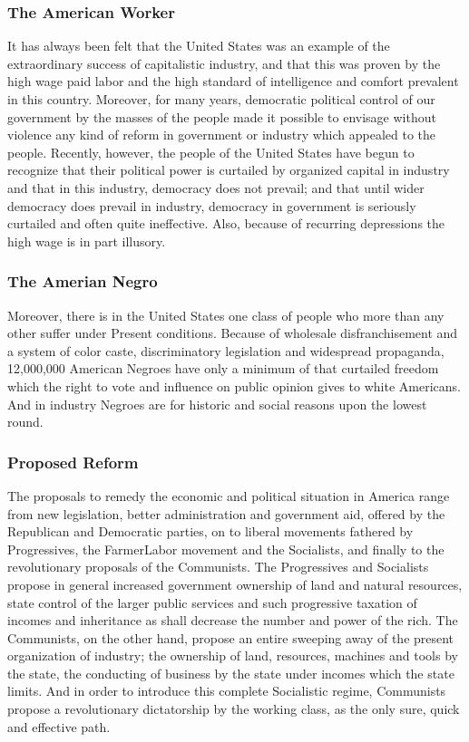 \documentclass[letterpaper,10pt,english]{jupyterBook}
\begin{document}
\subsubsection{The American Worker}
\label{\detokenize{Volumes/38/09/negro_and_communism:the-american-worker}}
\sphinxAtStartPar
It has always been felt that the United States was an example of the extraordinary success of capitalistic industry, and that this was proven by the high wage paid labor and the high standard of intelligence and comfort prevalent in this country. Moreover, for many years, democratic political control of our government by the masses of the people made it possible to envisage without violence any kind of reform in government or industry which appealed to the people. Recently, however, the people of the United States have begun to recognize that their political power is curtailed by organized capital in industry and that in this industry, democracy does not prevail; and that until wider democracy does prevail in industry, democracy in government is seriously curtailed and often quite ineffective. Also, because of recurring depressions the high wage is in part illusory.


\subsubsection{The Amerian Negro}
\label{\detokenize{Volumes/38/09/negro_and_communism:the-amerian-negro}}
\sphinxAtStartPar
Moreover, there is in the United States one class of people who more than any other suffer under Present conditions. Because of wholesale disfranchisement and a system of color caste, discriminatory legislation and widespread propaganda, 12,000,000 American Negroes have only a minimum of that curtailed freedom which the right to vote and influence on public opinion gives to white Americans. And in industry Negroes are for historic and social reasons upon the lowest round.


\subsubsection{Proposed Reform}
\label{\detokenize{Volumes/38/09/negro_and_communism:proposed-reform}}
\sphinxAtStartPar
The proposals to remedy the economic and political situation in America range from new legislation, better administration and government aid, offered by the Republican and Democratic parties, on to liberal movements fathered by Progressives, the Farmer\sphinxhyphen{}Labor movement and the Socialists, and finally to the revolutionary proposals of the Communists. The Progressives and Socialists propose in general increased government ownership of land and natural resources, state control of the larger public services and such progressive taxation of incomes and inheritance as shall decrease the number and power of the rich. The Communists, on the other hand, propose an entire sweeping away of the present organization of industry; the ownership of land, resources, machines and tools by the state, the conducting of business by the state under incomes which the state limits. And in order to introduce this complete Socialistic regime, Communists propose a revolutionary dictatorship by the working class, as the only sure, quick and effective path.
\end{document}
